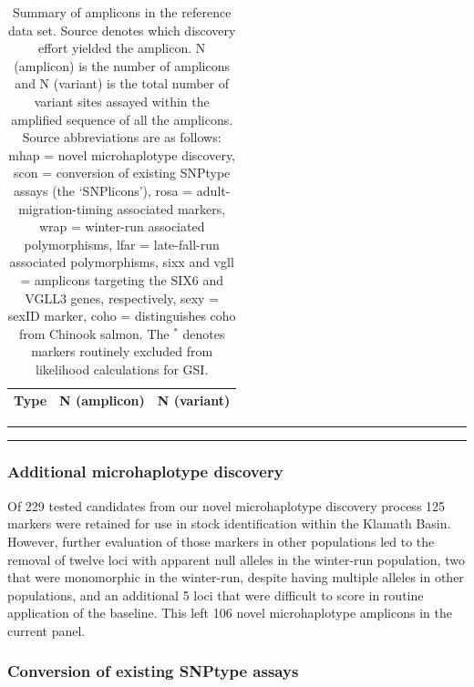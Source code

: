 \begin{table}
\caption{\footnotesize  Summary of amplicons in the reference data set.  Source denotes
which discovery effort yielded the amplicon. N (amplicon) is the number of amplicons
and N (variant) is the total number of variant sites assayed within the amplified sequence of all the
amplicons.  Source abbreviations are as follows: mhap = novel microhaplotype discovery, scon = conversion of existing SNPtype
assays (the `SNPlicons'), rosa = adult-migration-timing associated markers, wrap = winter-run associated
polymorphisms, lfar = late-fall-run associated polymorphisms, sixx and vgll = amplicons
targeting the SIX6 and VGLL3 genes, respectively, sexy = sexID marker, coho =
distinguishes coho from Chinook salmon. The $^*$ denotes markers routinely
excluded from likelihood calculations for GSI.}
\label{tab:loci-summ}
\begin{tabular*}{0.48\textwidth}{@{\extracolsep{\fill}} lrr}
\hline\hline
Type&N (amplicon)&N (variant)\tabularnewline
\hline

\end{tabular*}
\par\vspace*{-3.2ex}\noindent\rule{0.48\textwidth}{0.5pt}
\par\vspace*{-2.4ex}\noindent\rule{0.48\textwidth}{0.5pt}
\end{table}

\subsubsection*{Additional microhaplotype discovery}

Of 229 tested candidates from our novel microhaplotype discovery process
125 markers were retained \citep{thompson2020complex}
for use in stock identification within
the Klamath Basin.  However, further evaluation of those markers in other
populations led to the removal of
twelve loci with apparent null alleles in the winter-run population, two that were monomorphic
in the winter-run, despite having
multiple alleles in other populations, and an additional 5 loci that were
difficult to score in routine application of the baseline. This left 106
novel microhaplotype amplicons in the current panel.


\subsubsection*{Conversion of existing SNPtype assays}

